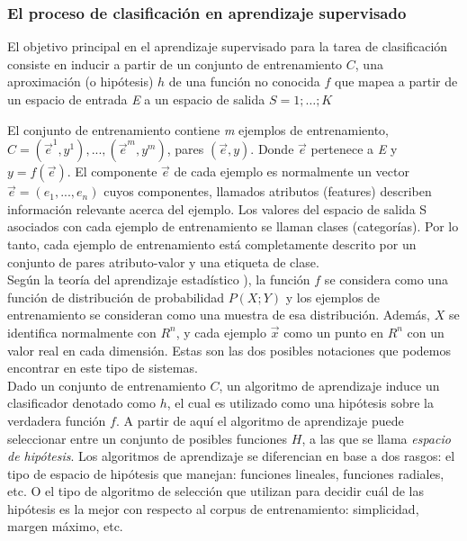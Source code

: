 \subsubsection*{El proceso de clasificación en aprendizaje supervisado}

El objetivo principal en el aprendizaje supervisado para la tarea de clasificación consiste en inducir a partir de un conjunto de entrenamiento $C$, una aproximación (o hipótesis) $h$ de una función no conocida $f$ que mapea a partir de un espacio de entrada \textit{E} a un espacio de salida $S = 1; …;K$

El conjunto de entrenamiento contiene \textit{m} ejemplos de entrenamiento, $C=(\vec{e}^1,y^1),...,(\vec{e}^m,y^m)$, pares $(\vec{e},y)$. Donde $\vec{e}$ pertenece a \textit{E} y $y=f(\vec{e})$. El componente $\vec{e}$ de cada ejemplo es normalmente un vector $\vec{e}=(e_1,...,e_n)$ cuyos componentes, llamados atributos (features) describen información relevante acerca del ejemplo. Los valores del espacio de salida S asociados con cada ejemplo de entrenamiento se llaman clases (categorías). Por lo tanto, cada ejemplo de entrenamiento está completamente descrito por un conjunto de pares atributo-valor y una etiqueta de clase.\\
Según la teoría del aprendizaje estadístico \cite{019}), la función $f$ se considera como una función de distribución de probabilidad $P(X;Y)$ y los ejemplos de entrenamiento se consideran como una muestra de esa distribución. Además, $X$ se identifica normalmente con $R^n$, y cada ejemplo $\vec{x}$ como un punto en $R^n$ con un valor real en cada dimensión. Estas son las dos posibles notaciones que podemos encontrar en este tipo de sistemas.\\
Dado un conjunto de entrenamiento $C$, un algoritmo de aprendizaje induce un clasificador denotado como $h$, el cual es utilizado como una hipótesis sobre la verdadera función $f$. A partir de aquí el algoritmo de aprendizaje puede seleccionar entre un conjunto de posibles funciones $H$, a las que se llama \textit{espacio de hipótesis}. Los algoritmos de aprendizaje se diferencian en base a dos rasgos: el tipo de espacio de hipótesis que manejan: funciones lineales, funciones radiales, etc. O el tipo de algoritmo de selección que utilizan para decidir cuál de las hipótesis es la mejor con respecto al corpus de entrenamiento: simplicidad, margen máximo, etc.\\
